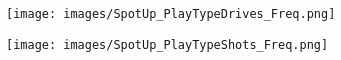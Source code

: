 \documentclass[a4paper,12pt]{article}
\begin{document}
\begin{table}[H]
    \centering
    \begin{minipage}[c]{0.45\textwidth} %
        \centering
        \texttt{[image: images/SpotUp\_PlayTypeDrives\_Freq.png]} %
    \end{minipage}
    \hfill %
    \begin{minipage}[c]{0.45\textwidth} %
        \centering
        \texttt{[image: images/SpotUp\_PlayTypeShots\_Freq.png]} %
    \end{minipage}
\end{table}

\vspace{-1em} %
\vspace{-1em} %
\end{document}
